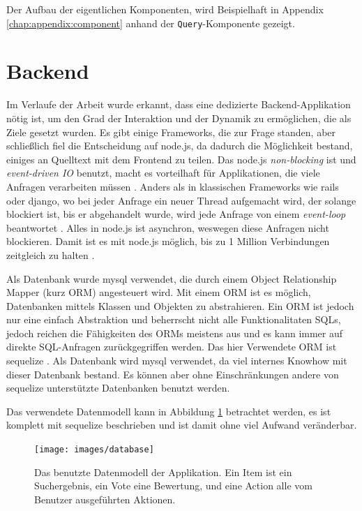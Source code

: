 \documentclass[12pt,twoside]{book}
\begin{document}
Der Aufbau der eigentlichen Komponenten, wird Beispielhaft in Appendix \ref{chap:appendix:component} anhand der \texttt{Query}-Komponente gezeigt.

\section{Backend}\label{sec:backend}

Im Verlaufe der Arbeit wurde erkannt, dass eine dedizierte Backend-Applikation nötig ist, um den Grad der Interaktion und der Dynamik zu ermöglichen, die als Ziele gesetzt wurden. Es gibt einige Frameworks, die zur Frage standen, aber schließlich fiel die Entscheidung auf node.js, da dadurch die Möglichkeit bestand, einiges an Quelltext mit dem Frontend zu teilen. Das node.js \textit{non-blocking} ist und \textit{event-driven IO} benutzt, macht es vorteilhaft für Applikationen, die viele Anfragen verarbeiten müssen \citep{tilkov2010node}. Anders als in klassischen Frameworks wie rails oder django, wo bei jeder Anfrage ein neuer Thread aufgemacht wird, der solange blockiert ist, bis er abgehandelt wurde, wird jede Anfrage von einem \textit{event-loop} beantwortet \citep{tilkov2010node}. Alles in node.js ist asynchron, weswegen diese Anfragen nicht blockieren. Damit ist es mit node.js möglich, bis zu 1 Million Verbindungen zeitgleich zu halten \cite{node1m}.

Als Datenbank wurde mysql verwendet, die durch einem Object Relationship Mapper (kurz ORM) angesteuert wird. Mit einem ORM ist es möglich, Datenbanken mittels Klassen und Objekten zu abstrahieren. Ein ORM ist jedoch nur eine einfach Abstraktion und beherrscht nicht alle Funktionalitaten SQLs, jedoch reichen die Fähigkeiten des ORMs meistens aus und es kann immer auf direkte SQL-Anfragen zurückgegriffen werden. Das hier Verwendete ORM ist sequelize \cite{sequelize}. Als Datenbank wird mysql verwendet, da viel internes Knowhow mit dieser Datenbank bestand. Es können aber ohne Einschränkungen andere von sequelize unterstützte Datenbanken benutzt werden.

Das verwendete Datenmodell kann in Abbildung \ref{fig:database} betrachtet werden, es ist komplett mit sequelize beschrieben und ist damit ohne viel Aufwand veränderbar.

\begin{figure}[htbp]
	\centering
	\texttt{[image: images/database]}
	\caption{Das benutzte Datenmodell der Applikation. Ein Item ist ein Suchergebnis, ein Vote eine Bewertung, und eine Action alle vom Benutzer ausgeführten Aktionen.}
	\label{fig:database}
\end{figure}
\end{document}
